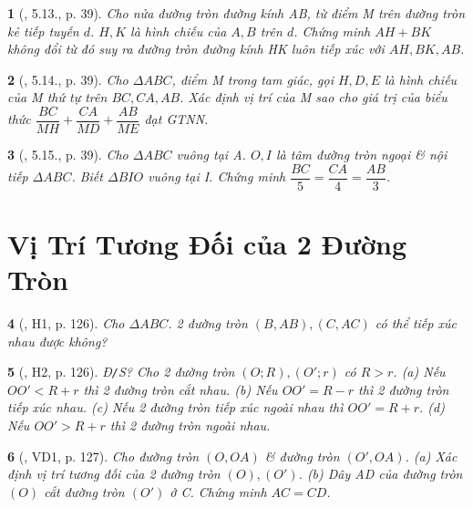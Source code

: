 \documentclass{article}
\newtheorem{baitoan}{}
\begin{document}
\begin{baitoan}[\cite{TLCT_THCS_Toan_9_hinh_hoc}, 5.13., p. 39]
	Cho nửa đường tròn đường kính AB, từ điểm M trên đường tròn kẻ tiếp tuyến $d$. $H,K$ là hình chiếu của $A,B$ trên $d$. Chứng minh $AH + BK$ không đổi từ đó suy ra đường tròn đường kính HK luôn tiếp xúc với $AH,BK,AB$.
\end{baitoan}

\begin{baitoan}[\cite{TLCT_THCS_Toan_9_hinh_hoc}, 5.14., p. 39]
	Cho $\Delta ABC$, điểm M trong tam giác, gọi $H,D,E$ là hình chiếu của M thứ tự trên $BC,CA,AB$. Xác định vị trí của M sao cho giá trị của biểu thức $\dfrac{BC}{MH} + \dfrac{CA}{MD} + \dfrac{AB}{ME}$ đạt {\rm GTNN}.
\end{baitoan}

\begin{baitoan}[\cite{TLCT_THCS_Toan_9_hinh_hoc}, 5.15., p. 39]
	Cho $\Delta ABC$ vuông tại A. $O,I$ là tâm đường tròn ngoại \& nội tiếp $\Delta ABC$. Biết $\Delta BIO$ vuông tại I. Chứng minh $\dfrac{BC}{5} = \dfrac{CA}{4} = \dfrac{AB}{3}$.
\end{baitoan}


\section{Vị Trí Tương Đối của 2 Đường Tròn}

\begin{baitoan}[\cite{Binh_boi_duong_Toan_9_tap_1}, H1, p. 126]
	Cho $\Delta ABC$. 2 đường tròn $(B,AB),(C,AC)$ có thể tiếp xúc nhau được không?
\end{baitoan}

\begin{baitoan}[\cite{Binh_boi_duong_Toan_9_tap_1}, H2, p. 126]
	{\rm Đ{\tt/}S?} Cho 2 đường tròn $(O;R),(O';r)$ có $R > r$. (a) Nếu $OO' < R + r$ thì 2 đường tròn cắt nhau. (b) Nếu $OO' = R - r$ thì 2 đường tròn tiếp xúc nhau. (c) Nếu 2 đường tròn tiếp xúc ngoài nhau thì $OO' = R + r$. (d) Nếu $OO' > R + r$ thì 2 đường tròn ngoài nhau.
\end{baitoan}

\begin{baitoan}[\cite{Binh_boi_duong_Toan_9_tap_1}, VD1, p. 127]
	Cho đường tròn $(O,OA)$ \& đường tròn $(O',OA)$. (a) Xác định vị trí tương đối của 2 đường tròn $(O),(O')$. (b) Dây AD của đường tròn $(O)$ cắt đường tròn $(O')$ ở C. Chứng minh $AC = CD$.
\end{baitoan}
\end{document}

